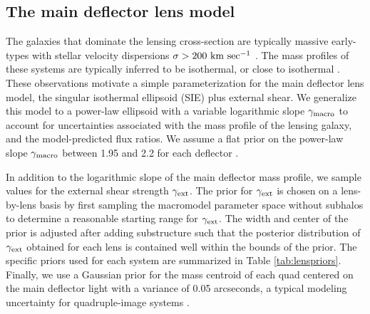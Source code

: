 \subsection{The main deflector lens model}
\label{ssec:macromodels}
The galaxies that dominate the lensing cross-section are typically massive early-types with stellar velocity dispersions $\sigma > 200 \ \rm{km} \ \rm{sec^{-1}}$ \citep{Gavazzi++07,Auger++10,Lagattuta++10}. The mass profiles of these systems are typically inferred to be isothermal, or close to isothermal \citep{Treu++06, Treu++09, Auger++10, Shankar++17}. These observations motivate a simple parameterization for the main deflector lens model, the singular isothermal ellipsoid (SIE) plus external shear. We generalize this model to a power-law ellipsoid with a variable logarithmic slope $\gamma_{\rm{macro}}$ to account for uncertainties associated with the mass profile of the lensing galaxy, and the model-predicted flux ratios. We assume a flat prior on the power-law slope $\gamma_{\rm{macro}}$ between 1.95 and 2.2 for each deflector \citep{Auger++10}. 

In addition to the logarithmic slope of the main deflector mass profile, we sample values for the external shear strength $\gamma_{\rm{ext}}$. The prior for $\gamma_{\rm{ext}}$ is chosen on a lens-by-lens basis by first sampling the macromodel parameter space without subhalos to determine a reasonable starting range for $\gamma_{\rm{ext}}$. The width and center of the prior is adjusted after adding substructure such that the posterior distribution of $\gamma_{\rm{ext}}$ obtained for each lens is contained well within the bounds of the prior. The specific priors used for each system are summarized in Table \ref{tab:lenspriors}. Finally, we use a Gaussian prior for the mass centroid of each quad centered on the main deflector light with a variance of 0.05 arcseconds, a typical modeling uncertainty for quadruple-image systems \citep{Shajib++18, Nierenberg++19}. 

